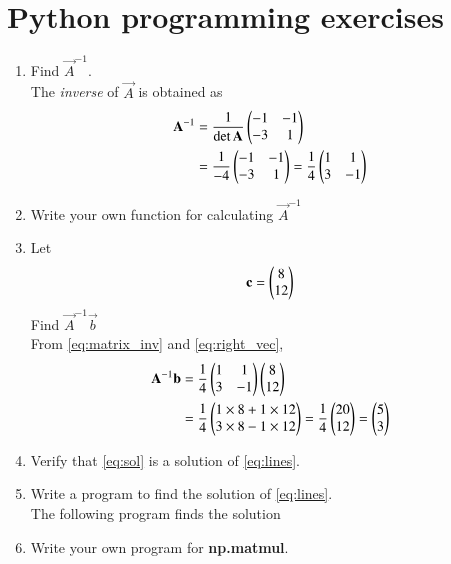 \documentclass[journal,12pt,twocolumn]{IEEEtran}
\renewcommand\thesection{\arabic{section}}
\begin{document}
\section{Python  programming exercises}
\begin{enumerate}[label=\thesection.\arabic*
,ref=\thesection.\theenumi]

\item Find $\vec{A}^{-1}$.
\\
\solution  The {\em inverse} of $\vec{A}$ is obtained as
\begin{align}
\label{eq:matrix_inv}
\mathbf{A}^{-1} &= \frac{1}{\det{\mathbf{A}}}\begin{pmatrix}-1 & -1 \\ -3 & 1\end{pmatrix}
\\
 &= \frac{1}{-4}\begin{pmatrix}-1 & -1 \\ -3 & 1\end{pmatrix}
 = \frac{1}{4}\begin{pmatrix}1 & 1 \\ 3 & -1\end{pmatrix}
\end{align}
%
\item Write your own function for calculating $\vec{A}^{-1}$
\item Let 
\begin{align}
\label{eq:right_vec}
\mathbf{c} = \begin{pmatrix}8 \\12\end{pmatrix}
\end{align}
Find $\vec{A}^{-1}\vec{b}$
\\
\solution From \eqref{eq:matrix_inv} and \eqref{eq:right_vec},%
\begin{align}
\mathbf{A}^{-1}\mathbf{b}&= \frac{1}{4}\begin{pmatrix}1 & 1 \\ 3 & -1\end{pmatrix}\begin{pmatrix}8 \\12\end{pmatrix}
\\
&= \frac{1}{4}\begin{pmatrix}1\times8+  1\times12 \\ 3\times8  -1\times12\end{pmatrix}=\frac{1}{4}\begin{pmatrix}20 \\12\end{pmatrix} = \begin{pmatrix}5 \\3\end{pmatrix}
\label{eq:sol}
\end{align}
\item Verify that \eqref{eq:sol} is a solution of \eqref{eq:lines}.
\item Write a program to find the solution of \eqref{eq:lines}.
\\
\solution The following program finds the solution 

\item Write your own program for \textbf{np.matmul}.
\end{enumerate}
\end{document}
